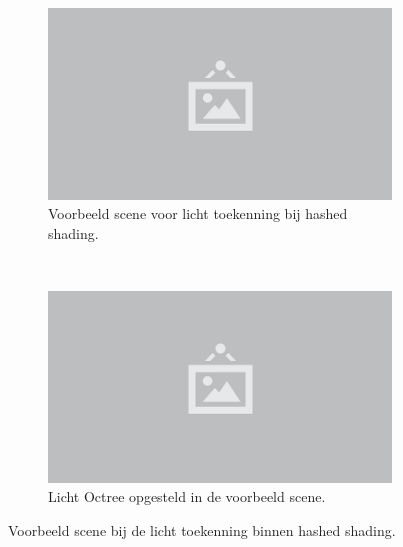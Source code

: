 \begin{figure}
  \centering
  \begin{subfigure}[b]{.95\linewidth}
    \includegraphics[width=\textwidth]{./img/raw/placeholder.png}
    \caption{Voorbeeld scene voor licht toekenning bij hashed shading.}
    \label{fig:hs-licht-toekenning:scene}
  \end{subfigure}
  \\
  \begin{subfigure}[b]{.95\linewidth}
    \includegraphics[width=\textwidth]{./img/raw/placeholder.png}
    \caption{Licht Octree opgesteld in de voorbeeld scene.}
    \label{fig:hs-licht-toekenning:licht-octree}
  \end{subfigure}
  \caption{Voorbeeld scene bij de licht toekenning binnen hashed shading.}
  \label{fig:hs-licht-toekenning}
\end{figure}
